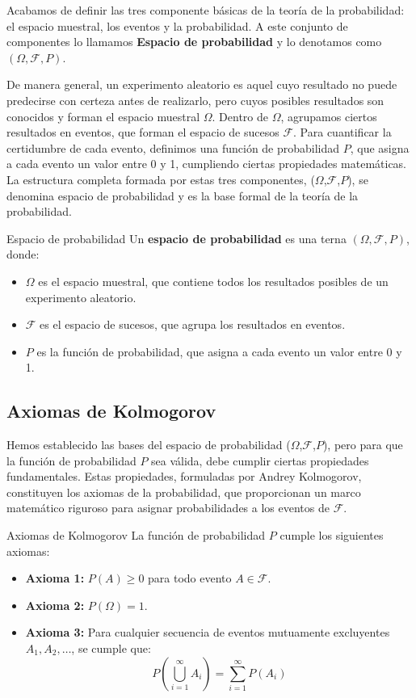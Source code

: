 Acabamos de definir las tres componente básicas de la teoría de la probabilidad: el espacio muestral, los eventos y la probabilidad. A este
conjunto de componentes lo llamamos \textbf{Espacio de probabilidad} y lo denotamos como $(\Omega, \mathcal{F}, P)$.

De manera general, un experimento aleatorio es aquel cuyo resultado no puede predecirse con certeza antes de realizarlo, pero cuyos posibles resultados son conocidos y forman el espacio muestral $\Omega$. Dentro de $\Omega$, agrupamos ciertos resultados en eventos, que forman el espacio de sucesos $\mathcal{F}$. Para cuantificar la certidumbre de cada evento, definimos una función de probabilidad $P$, que asigna a cada evento un valor entre 0 y 1, cumpliendo ciertas propiedades matemáticas. La estructura completa formada por estas tres componentes, ($\Omega$,$\mathcal{F}$,$P$), se denomina espacio de probabilidad y es la base formal de la teoría de la probabilidad.

\begin{definicion}{Espacio de probabilidad}
Un \textbf{espacio de probabilidad} es una terna $(\Omega, \mathcal{F}, P)$, donde:

\begin{itemize}
    \item $\Omega$ es el espacio muestral, que contiene todos los resultados posibles de un experimento aleatorio.
    \item $\mathcal{F}$ es el espacio de sucesos, que agrupa los resultados en eventos.
    \item $P$ es la función de probabilidad, que asigna a cada evento un valor entre 0 y 1.
\end{itemize}
\end{definicion}

\subsection{Axiomas de Kolmogorov}

Hemos establecido las bases del espacio de probabilidad ($\Omega$,$\mathcal{F}$,$P$), pero para que la función de probabilidad $P$ sea válida, debe cumplir ciertas propiedades fundamentales. Estas propiedades, formuladas por Andrey Kolmogorov, constituyen los axiomas de la probabilidad, que proporcionan un marco matemático riguroso para asignar probabilidades a los eventos de $\mathcal{F}$.

\begin{definicion}{Axiomas de Kolmogorov}
La función de probabilidad $P$ cumple los siguientes axiomas:

\begin{itemize}
    \item \textbf{Axioma 1:} $P(A) \geq 0$ para todo evento $A \in \mathcal{F}$.
    \item \textbf{Axioma 2:} $P(\Omega) = 1$.
    \item \textbf{Axioma 3:} Para cualquier secuencia de eventos mutuamente excluyentes $A_1, A_2, \ldots$, se cumple que:
    $$
    P\left(\bigcup_{i=1}^{\infty} A_i\right) = \sum_{i=1}^{\infty} P(A_i)
    $$
\end{itemize}
\end{definicion}

